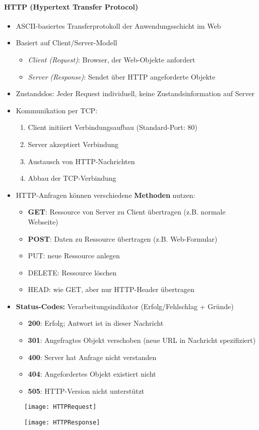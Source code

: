 \paragraph{HTTP (Hypertext Transfer Protocol)}
\begin{itemize}
  \item ASCII-basiertes Transferprotokoll der Anwendungsschicht im Web
  \item Basiert auf Client/Server-Modell
  \begin{itemize}
    \item \emph{Client (Request)}: Browser, der Web-Objekte anfordert
    \item \emph{Server (Response)}: Sendet über HTTP angeforderte Objekte
  \end{itemize}
  \item Zustandslos: Jeder Request individuell, keine Zustandsinformation auf Server
  \item Kommunikation per TCP:
  \begin{enumerate}
    \item Client initiiert Verbindungsaufbau (Standard-Port: 80)
    \item Server akzeptiert Verbindung
    \item Austausch von HTTP-Nachrichten
    \item Abbau der TCP-Verbindung
  \end{enumerate}
  \item HTTP-Anfragen können verschiedene \textbf{Methoden} nutzen:
  \begin{itemize}
    \item \textbf{GET}: Ressource von Server zu Client übertragen (z.B. normale Webseite)
    \item \textbf{POST}: Daten zu Ressource übertragen (z.B. Web-Formular)
    \item PUT: neue Ressource anlegen
    \item DELETE: Ressource löschen
    \item HEAD: wie GET, aber nur HTTP-Header übertragen
  \end{itemize}
  \item \textbf{Status-Codes:} Verarbeitungsindikator (Erfolg/Fehlschlag + Gründe)
  \begin{itemize}
    \item \textbf{200}: Erfolg; Antwort ist in dieser Nachricht
    \item \textbf{301}: Angefragtes Objekt verschoben (neue URL in Nachricht spezifiziert)
    \item \textbf{400}: Server hat Anfrage nicht verstanden
    \item \textbf{404}: Angefordertes Objekt existiert nicht
    \item \textbf{505}: HTTP-Version nicht unterstützt
  \end{itemize}
\end{itemize}
  \begin{figure}[H]\centering\texttt{[image: HTTPRequest]}\end{figure}
\begin{figure}[H]\centering\texttt{[image: HTTPResponse]}\end{figure}

